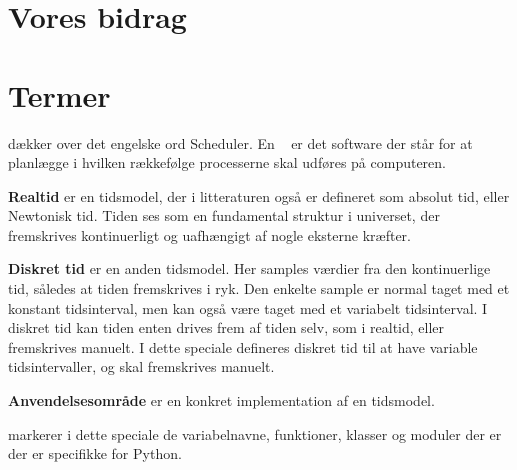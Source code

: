 
\section{Vores bidrag}
\section{Termer}


\begin{list}{}{}
\item \textbf{\Sched} dækker over det engelske ord Scheduler. En \sched~ er det software der står for at planlægge i hvilken rækkefølge processerne skal udføres på computeren.
\item \textbf{Realtid} er en tidsmodel, der i litteraturen også er defineret som absolut tid, eller Newtonisk tid. Tiden ses som en fundamental struktur i universet, der 
fremskrives kontinuerligt og uafhængigt af nogle eksterne kræfter.
\item \textbf{Diskret tid} er en anden tidsmodel. Her samples værdier fra den kontinuerlige tid, således at tiden fremskrives i ryk. Den enkelte sample er normal taget med et konstant tidsinterval, men kan også være taget med et variabelt tidsinterval. I diskret tid kan tiden enten drives frem af tiden selv, som i realtid, eller fremskrives manuelt. I dette speciale defineres diskret tid til at have variable tidsintervaller, og skal fremskrives manuelt.
\item \textbf{Anvendelsesområde} er en konkret implementation af en tidsmodel.
\item \textbf{} markerer i dette speciale de  variabelnavne, funktioner,  klasser og moduler der er der er specifikke for Python.
\end{list}



